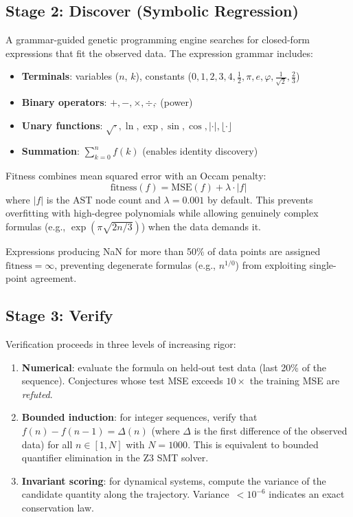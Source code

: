 \documentclass[11pt,a4paper]{article}
\begin{document}
\subsection{Stage 2: Discover (Symbolic Regression)}

A grammar-guided genetic programming engine searches for closed-form
expressions that fit the observed data. The expression grammar includes:

\begin{itemize}
  \item \textbf{Terminals}: variables ($n$, $k$), constants
    ($0, 1, 2, 3, 4, \frac{1}{2}, \pi, e, \varphi, \frac{1}{\sqrt{2}},
    \frac{2}{3}$)
  \item \textbf{Binary operators}: $+, -, \times, \div, \hat{}$ (power)
  \item \textbf{Unary functions}: $\sqrt{\cdot}, \ln, \exp, \sin, \cos,
    |\cdot|, \lfloor\cdot\rfloor$
  \item \textbf{Summation}: $\sum_{k=0}^{n} f(k)$ (enables identity
    discovery)
\end{itemize}

Fitness combines mean squared error with an Occam penalty:
\begin{equation}
  \text{fitness}(f) = \text{MSE}(f) + \lambda \cdot |f|
  \label{eq:fitness}
\end{equation}
where $|f|$ is the AST node count and $\lambda = 0.001$ by default. This
prevents overfitting with high-degree polynomials while allowing genuinely
complex formulas (e.g., $\exp(\pi\sqrt{2n/3})$) when the data demands it.

Expressions producing NaN for more than 50\% of data points are assigned
$\text{fitness} = \infty$, preventing degenerate formulas (e.g.,
$n^{1/0}$) from exploiting single-point agreement.

\subsection{Stage 3: Verify}

Verification proceeds in three levels of increasing rigor:

\begin{enumerate}
  \item \textbf{Numerical}: evaluate the formula on held-out test data
    (last 20\% of the sequence). Conjectures whose test MSE exceeds
    $10\times$ the training MSE are \emph{refuted}.
  \item \textbf{Bounded induction}: for integer sequences, verify that
    $f(n) - f(n{-}1) = \Delta(n)$ (where $\Delta$ is the first difference
    of the observed data) for all $n \in [1, N]$ with $N = 1000$. This is
    equivalent to bounded quantifier elimination in the Z3 SMT solver.
  \item \textbf{Invariant scoring}: for dynamical systems, compute the
    variance of the candidate quantity along the trajectory.
    Variance~$< 10^{-6}$ indicates an exact conservation law.
\end{enumerate}
\end{document}
